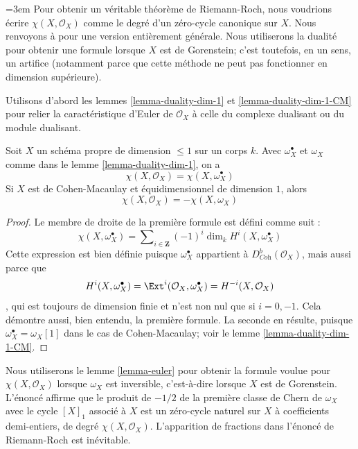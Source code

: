 \medskip\noindent
{\emergencystretch=3em
Pour obtenir un véritable théorème de Riemann-Roch, nous voudrions écrire $\chi(X, \mathcal{O}_X)$ comme le degré d'un zéro-cycle canonique sur $X$. Nous renvoyons à \cite{F} pour une version entièrement générale. Nous utiliserons la dualité pour obtenir une formule lorsque $X$ est de Gorenstein; c'est toutefois, en un sens, un artifice (notamment parce que cette méthode ne peut pas fonctionner en dimension supérieure).
\par}

\medskip\noindent
Utilisons d'abord les lemmes \ref{lemma-duality-dim-1} et \ref{lemma-duality-dim-1-CM} pour relier la caractéristique d'Euler de $\mathcal{O}_X$ à celle du complexe dualisant ou du module dualisant.

\begin{lemma}
\label{lemma-euler}
Soit $X$ un schéma propre de dimension $\leq 1$ sur un corps $k$. Avec $\omega_X^\bullet$ et $\omega_X$ comme dans le lemme \ref{lemma-duality-dim-1}, on a $$
\chi(X, \mathcal{O}_X) = \chi(X, \omega_X^\bullet)
$$ Si $X$ est de Cohen-Macaulay et équidimensionnel de dimension $1$, alors
$$
\chi(X, \mathcal{O}_X) = - \chi(X, \omega_X)
$$
\end{lemma}

\begin{proof}
Le membre de droite de la première formule est défini comme suit : $$
\chi(X, \omega_X^\bullet) =
\sum\nolimits_{i \in \mathbf{Z}} (-1)^i\dim_k H^i(X, \omega_X^\bullet)
$$ Cette expression est bien définie puisque $\omega_X^\bullet$ appartient à $D^b_{\textit{Coh}}(\mathcal{O}_X)$, mais aussi parce que $$
H^i(X, \omega_X^\bullet) =
\Ext^i(\mathcal{O}_X, \omega_X^\bullet) =
H^{-i}(X, \mathcal{O}_X)
$$, qui est toujours de dimension finie et n'est non nul que si $i = 0, -1$. Cela démontre aussi, bien entendu, la première formule. La seconde en résulte, puisque $\omega_X^\bullet = \omega_X[1]$ dans le cas de Cohen-Macaulay; voir le lemme \ref{lemma-duality-dim-1-CM}.
\end{proof}

\noindent
Nous utiliserons le lemme \ref{lemma-euler} pour obtenir la formule voulue pour $\chi(X, \mathcal{O}_X)$ lorsque $\omega_X$ est inversible, c'est-à-dire lorsque $X$ est de Gorenstein. L'énoncé affirme que le produit de $-1/2$ de la première classe de Chern de $\omega_X$ avec le cycle $[X]_1$ associé à $X$ est un zéro-cycle naturel sur $X$ à coefficients demi-entiers, de degré $\chi(X, \mathcal{O}_X)$. L'apparition de fractions dans l'énoncé de Riemann-Roch est inévitable.

